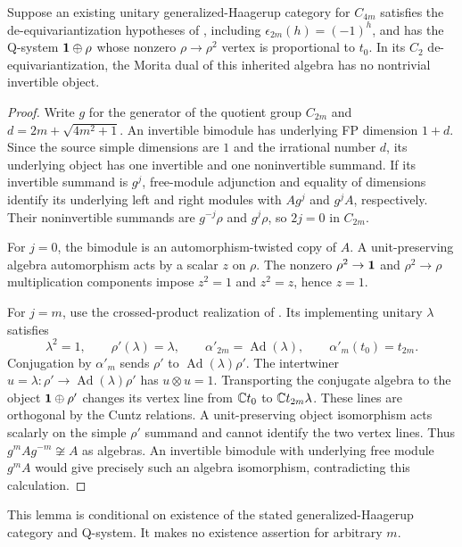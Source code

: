 \begin{lemma}
\label{lem:cyclic-gh-invertibles-next}
Suppose an existing unitary generalized-Haagerup category for $C_{4m}$
satisfies the de-equivariantization hypotheses of
\cite[Section~6]{GrossmanIzumiCentersNext}, including
$\epsilon_{2m}(h)=(-1)^h$, and has the Q-system $\mathbf1\oplus\rho$
whose nonzero $\rho\to\rho^2$ vertex is proportional to $t_0$.
In its $C_2$ de-equivariantization, the Morita dual of this inherited algebra
has no nontrivial invertible object.
\end{lemma}
\begin{proof}
Write $g$ for the generator of the quotient group $C_{2m}$ and
$d=2m+\sqrt{4m^2+1}$. An invertible bimodule has underlying FP dimension
$1+d$. Since the source simple dimensions are $1$ and the irrational number
$d$, its underlying object has one invertible and one noninvertible
summand. If its invertible summand is $g^j$, free-module adjunction and
 equality of dimensions identify its underlying left and right modules with
$A g^j$ and $g^j A$, respectively. Their noninvertible summands are
$g^{-j}\rho$ and $g^j\rho$, so $2j=0$ in $C_{2m}$.

For $j=0$, the bimodule is an automorphism-twisted copy of $A$.
A unit-preserving algebra automorphism acts by a scalar $z$ on $\rho$.
The nonzero $\rho^2\to\mathbf1$ and $\rho^2\to\rho$ multiplication components
impose $z^2=1$ and $z^2=z$, hence $z=1$.

For $j=m$, use the crossed-product realization of
\cite[Section~6]{GrossmanIzumiCentersNext}. Its implementing unitary
$\lambda$ satisfies
\[
 \lambda^2=1,\qquad \rho'(\lambda)=\lambda,\qquad
 \alpha'_{2m}=\operatorname{Ad}(\lambda),\qquad
 \alpha'_m(t_0)=t_{2m}.
\]
Conjugation by $\alpha'_m$ sends $\rho'$ to
$\operatorname{Ad}(\lambda)\rho'$. The intertwiner
$u=\lambda:\rho'\to\operatorname{Ad}(\lambda)\rho'$ has
$u\otimes u=1$. Transporting the conjugate algebra to the object
$\mathbf1\oplus\rho'$ changes its vertex line from $\mathbb C t_0$ to
$\mathbb C t_{2m}\lambda$. These lines are orthogonal by the Cuntz relations.
A unit-preserving object isomorphism acts scalarly on the simple
$\rho'$ summand and cannot identify the two vertex lines. Thus
$g^m A g^{-m}\not\cong A$ as algebras. An invertible bimodule with underlying
free module $g^m A$ would give precisely such an algebra isomorphism,
contradicting this calculation.
\end{proof}
This lemma is conditional on existence of the stated generalized-Haagerup
category and Q-system. It makes no existence assertion for arbitrary $m$.

